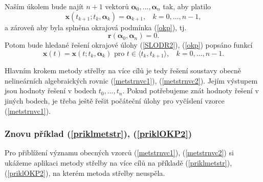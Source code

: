\documentclass[a4paper, 12pt]{book}
\theoremstyle{definition}
\def\vc#1{\mathbf{\boldsymbol{#1}}}     %
\begin{document}
Naším úkolem bude najít $n+1$ vektorů $\vc\alpha_0,\dots,\vc\alpha_n$ tak, aby 
platilo
\begin{equation}\label{metstrnvc1}
\vc x(t_{k+1};t_k,\vc\alpha_k)=\vc\alpha_{k+1}, ~~~~ k=0,\dots,n-1,
\end{equation}
a zároveň aby byla splněna okrajová podmínka (\ref{okp}), tj.
\begin{equation}\label{metstrnvc2}
\vc r(\vc\alpha_0,\vc\alpha_n)=0.
\end{equation}
Potom bude hledané řešení okrajové úlohy (\ref{SLODR2}), (\ref{okp}) popsáno
funkcí
\begin{equation}\label{metstrnvc3}
\vc x(t)=\vc x(t;t_k,\vc\alpha_k) \mbox{ pro } t\in\langle t_k,t_{k+1}\rangle, ~~~~k=0,\dots,n-1.
\end{equation}

Hlavním krokem metody střelby na více cílů je tedy řešení soustavy obecně nelineárních
algebraických rovnic (\ref{metstrnvc1}), (\ref{metstrnvc2}). Jejím výstupem jsou hodnoty
řešení v bodech $t_0,\dots,t_n$. Pokud potřebujeme znát hodnoty řešení v jiných bodech, 
je třeba ještě řešit počáteční úlohy pro vyčíslení vzorce (\ref{metstrnvc1}).

\subsubsection{Znovu příklad (\ref{priklmetstr}), (\ref{priklOKP2})}
Pro přiblížení významu obecných vzorců (\ref{metstrnvc1}), (\ref{metstrnvc2}) si
ukážeme aplikaci metody střelby na více cílů na příkladě (\ref{priklmetstr}), 
(\ref{priklOKP2}), na kterém metoda střelby neuspěla.
\end{document}
